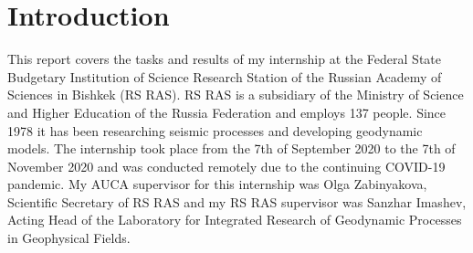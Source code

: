 \documentclass[../00_main.tex]{subfiles}
\begin{document}
\section{Introduction}

This report covers the tasks and results of my internship at the 
Federal State
Budgetary Institution of Science Research Station of the Russian Academy of 
Sciences in Bishkek (RS RAS). RS RAS is a subsidiary of the Ministry of Science 
and Higher Education of the Russia Federation and employs 137 people. Since 
1978 it has been researching seismic processes and developing geodynamic
models. 
The internship took place from the 7th of September 2020 to the 7th of November 2020 and was conducted remotely due to
the continuing COVID-19 pandemic. My AUCA supervisor for this internship was
Olga Zabinyakova, Scientific Secretary of RS RAS and my RS RAS supervisor was
Sanzhar Imashev, Acting Head of the Laboratory for Integrated Research of
Geodynamic Processes in Geophysical Fields.\newline
\end{document}
